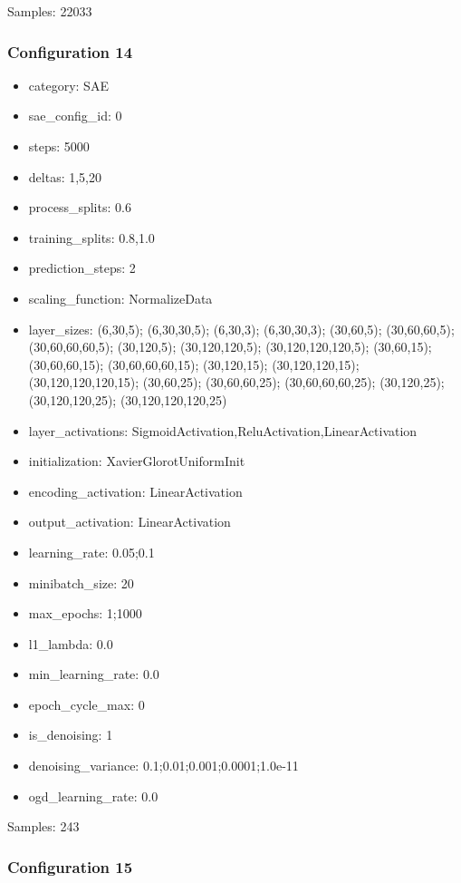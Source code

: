 \documentclass[a4paper,11pt,oneside]{article}
\theoremstyle{plain}
\theoremstyle{definition}
\begin{document}
	Samples: 22033
	
	\subsubsection{Configuration 14}\label{config14}
	\begin{itemize}
		\item category: SAE
		\item sae\_config\_id: 0
		\item steps: 5000
		\item deltas: 1,5,20
		\item process\_splits: 0.6
		\item training\_splits: 0.8,1.0
		\item prediction\_steps: 2
		\item scaling\_function: NormalizeData
		\item layer\_sizes: (6,30,5); (6,30,30,5); (6,30,3); (6,30,30,3); (30,60,5); (30,60,60,5); (30,60,60,60,5); (30,120,5); (30,120,120,5); (30,120,120,120,5); (30,60,15); (30,60,60,15); (30,60,60,60,15); (30,120,15); (30,120,120,15); (30,120,120,120,15); (30,60,25); (30,60,60,25); (30,60,60,60,25); (30,120,25); (30,120,120,25); (30,120,120,120,25)
		\item layer\_activations: SigmoidActivation,ReluActivation,LinearActivation
		\item initialization: XavierGlorotUniformInit
		\item encoding\_activation: LinearActivation
		\item output\_activation: LinearActivation
		\item learning\_rate: 0.05;0.1
		\item minibatch\_size: 20
		\item max\_epochs: 1;1000
		\item l1\_lambda: 0.0
		\item min\_learning\_rate: 0.0
		\item epoch\_cycle\_max: 0
		\item is\_denoising: 1
		\item denoising\_variance: 0.1;0.01;0.001;0.0001;1.0e-11
		\item ogd\_learning\_rate: 0.0
	\end{itemize}
	
	Samples: 243
	
	\subsubsection{Configuration 15}\label{config15}
	
\end{document}
